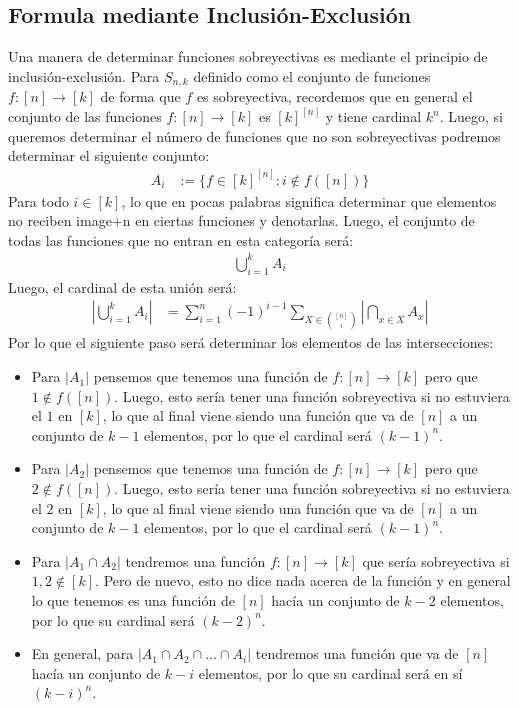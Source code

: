 \documentclass[12pt,a4paper,oneside]{memoir}
\begin{document}
\subsection*{Formula mediante Inclusión-Exclusión}
Una manera de determinar funciones sobreyectivas es mediante el principio de inclusión-exclusión. Para $S_{n, k}$ definido como el conjunto de funciones $f: [n] \to [k]$ de forma que $f$ es sobreyectiva, recordemos que en general el conjunto de las funciones $f: [n] \to [k]$ es $[k]^{[n]}$ y tiene cardinal $k^n$. Luego, si queremos determinar el número de funciones que no son sobreyectivas podremos determinar el siguiente conjunto:
\begin{align*}
    A_i &:= \{f \in [k]^{[n]} : i \not\in f([n])\}
\end{align*}
Para todo $i \in [k]$, lo que en pocas palabras significa determinar que elementos no reciben image+n en ciertas funciones y denotarlas. Luego, el conjunto de todas las funciones que no entran en esta categoría será:
\begin{align*}
    \bigcup_{i = 1}^k A_i
\end{align*}
Luego, el cardinal de esta unión será:
\begin{align*}
    \left|\bigcup_{i = 1}^k A_i\right| &= \sum_{i = 1}^n (-1)^{i-1} \sum_{X \in \binom{[n]}{i}} \left|\bigcap_{x \in X} A_x\right|
\end{align*}
Por lo que el siguiente paso será determinar los elementos de las intersecciones:
\begin{itemize}
    \item Para $|A_1|$ pensemos que tenemos una función de $f: [n] \to [k]$ pero que $1 \not\in f([n])$. Luego, esto sería tener una función sobreyectiva si no estuviera el $1$ en $[k]$, lo que al final viene siendo una función que va de $[n]$ a un conjunto de $k-1$ elementos, por lo que el cardinal será $(k-1)^n$. 
    \item Para $|A_2|$ pensemos que tenemos una función de $f: [n] \to [k]$ pero que $2 \not\in f([n])$. Luego, esto sería tener una función sobreyectiva si no estuviera el $2$ en $[k]$, lo que al final viene siendo una función que va de $[n]$ a un conjunto de $k-1$ elementos, por lo que el cardinal será $(k-1)^n$.
    \item Para $|A_1 \cap A_2|$ tendremos una función $f: [n] \to [k]$ que sería sobreyectiva si $1, 2 \not \in [k]$. Pero de nuevo, esto no dice nada acerca de la función y en general lo que tenemos es una función de $[n]$ hacía un conjunto de $k-2$ elementos, por lo que su cardinal será $(k-2)^n$.
    \item En general, para $|A_1 \cap A_2 \cap \dots \cap A_i|$ tendremos una función que va de $[n]$ hacía un conjunto de $k-i$ elementos, por lo que su cardinal será en sí $(k-i)^n$.
\end{itemize}
\end{document}
